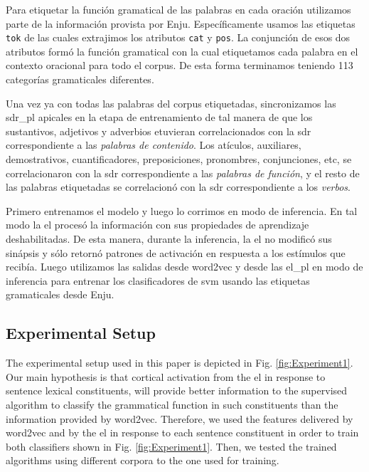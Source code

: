 {Para etiquetar la función gramatical de las palabras en cada oración utilizamos parte de la información provista por Enju.
Específicamente usamos las etiquetas \texttt{tok} de las cuales extrajimos los atributos \texttt{cat} y \texttt{pos}.
La conjunción de esos dos atributos formó la función gramatical con la cual etiquetamos cada palabra en el contexto oracional para todo el corpus.
De esta forma terminamos teniendo 113 categorías gramaticales diferentes.

Una vez ya con todas las palabras del corpus etiquetadas, sincronizamos las \gls{sdr_pl} apicales en la etapa de entrenamiento de tal manera de que los sustantivos, adjetivos y adverbios etuvieran correlacionados con la \gls{sdr} correspondiente a las \emph{palabras de contenido}. Los atículos, auxiliares, demostrativos, cuantificadores, preposiciones, pronombres, conjunciones, etc, se correlacionaron con la \gls{sdr} correspondiente a las \emph{palabras de función}, y el resto de las palabras etiquetadas se correlacionó con la \gls{sdr} correspondiente a los \emph{verbos}.

Primero entrenamos el modelo y luego lo corrimos en modo de inferencia.
En tal modo la \gls{el} procesó la información con sus propiedades de aprendizaje deshabilitadas.
De esta manera, durante la inferencia, la \gls{el} no modificó sus sinápsis y sólo retornó patrones de activación en respuesta a los estímulos que recibía.
Luego utilizamos las salidas desde word2vec y desde las \gls{el_pl} en modo de inferencia para entrenar los clasificadores de \gls{svm} usando las etiquetas gramaticales desde Enju.
}{
\subsection{Experimental Setup}

The experimental setup used in this paper is depicted in Fig. \ref{fig:Experiment1}. Our main hypothesis is that cortical activation from the \gls{el} in response to sentence lexical constituents, will provide better information to the supervised algorithm to classify the grammatical function in such constituents than the information provided by word2vec. Therefore, we used the features delivered by word2vec and by the \gls{el} in response to each sentence constituent in order to train both classifiers shown in Fig. \ref{fig:Experiment1}. Then, we tested the trained algorithms using different corpora to the one used for training.


}
